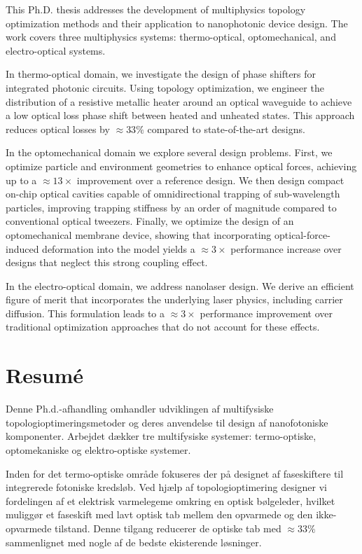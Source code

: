 This Ph.D. thesis addresses the development of multiphysics topology optimization methods and their application to nanophotonic device design. The work covers three multiphysics systems: thermo-optical, optomechanical, and electro-optical systems.

In thermo-optical domain, we investigate the design of phase shifters for integrated photonic circuits. Using topology optimization, we engineer the distribution of a resistive metallic heater around an optical waveguide to achieve a low optical loss phase shift between heated and unheated states. This approach reduces optical losses by $\approx 33\%$ compared to state-of-the-art designs.

In the optomechanical domain we explore several design problems. First, we optimize particle and environment geometries to enhance optical forces, achieving up to a $\approx 13 \times$ improvement over a reference design. We then design compact on-chip optical cavities capable of omnidirectional trapping of sub-wavelength particles, improving trapping stiffness by an order of magnitude compared to conventional optical tweezers. Finally, we optimize the design of an optomechanical membrane device, showing that incorporating optical-force-induced deformation into the model yields a $\approx 3 \times$ performance increase over designs that neglect this strong coupling effect.

In the electro-optical domain, we address nanolaser design. We derive an efficient figure of merit that incorporates the underlying laser physics, including carrier diffusion. This formulation leads to a $\approx 3\times$ performance improvement over traditional optimization approaches that do not account for these effects.

\chapter*{Resumé}
Denne Ph.d.-afhandling omhandler udviklingen af multifysiske topologioptimeringsmetoder og deres anvendelse til design af nanofotoniske komponenter. Arbejdet dækker tre multifysiske systemer: termo-optiske, opto\-mekaniske og elektro-optiske systemer.

Inden for det termo-optiske område fokuseres der på designet af fase\-skiftere til integrerede fotoniske kredsløb. Ved hjælp af topologioptimering designer vi fordelingen af et elektrisk varmelegeme omkring en optisk bølgeleder, hvil\-ket muliggør et faseskift med lavt optisk tab mellem den opvarmede og den ikke-opvarmede tilstand. Denne tilgang reducerer de optiske tab med $\approx 33\%$ sammenlignet med nogle af de bedste ekisterende løsninger.

